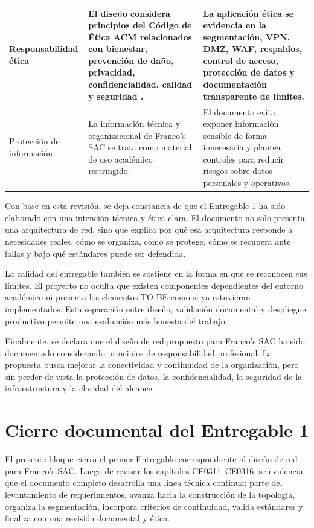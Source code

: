 \documentclass[11pt, a4paper, oneside]{report}
\begin{document}
\begin{xltabular}{\textwidth}{@{}|L{3.4cm}|X|X|@{}}
{\small Responsabilidad ética} &
{\small El diseño considera principios del Código de Ética ACM relacionados con bienestar, prevención de daño, privacidad, confidencialidad, calidad y seguridad \cite{acmcode}.} &
{\small La aplicación ética se evidencia en la segmentación, VPN, DMZ, WAF, respaldos, control de acceso, protección de datos y documentación transparente de límites.} \\ \hline

{\small Protección de información} &
{\small La información técnica y organizacional de Franco's SAC se trata como material de uso académico restringido.} &
{\small El documento evita exponer información sensible de forma innecesaria y plantea controles para reducir riesgos sobre datos personales y operativos.} \\ \hline

\end{xltabular}

\normalsize

Con base en esta revisión, se deja constancia de que el Entregable 1 ha sido elaborado con una intención técnica y ética clara. El documento no solo presenta una arquitectura de red, sino que explica por qué esa arquitectura responde a necesidades reales, cómo se organiza, cómo se protege, cómo se recupera ante fallas y bajo qué estándares puede ser defendida.

La calidad del entregable también se sostiene en la forma en que se reconocen sus límites. El proyecto no oculta que existen componentes dependientes del entorno académico ni presenta los elementos TO-BE como si ya estuvieran implementados. Esta separación entre diseño, validación documental y despliegue productivo permite una evaluación más honesta del trabajo.

Finalmente, se declara que el diseño de red propuesto para Franco's SAC ha sido documentado considerando principios de responsabilidad profesional. La propuesta busca mejorar la conectividad y continuidad de la organización, pero sin perder de vista la protección de datos, la confidencialidad, la seguridad de la infraestructura y la claridad del alcance.

\section{Cierre documental del Entregable 1}

El presente bloque cierra el primer Entregable correspondiente al diseño de red para Franco's SAC. Luego de revisar los capítulos CE0311--CE0316, se evidencia que el documento completo desarrolla una línea técnica continua: parte del levantamiento de requerimientos, avanza hacia la construcción de la topología, organiza la segmentación, incorpora criterios de continuidad, valida estándares y finaliza con una revisión documental y ética.
\end{document}
